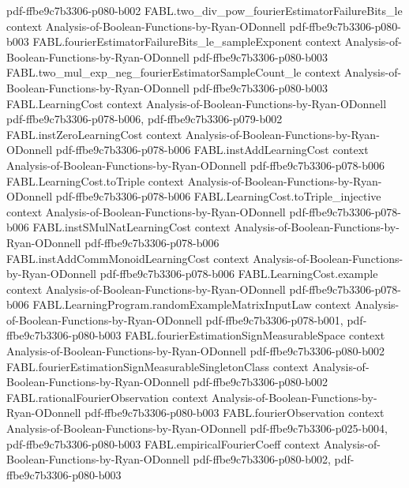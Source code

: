 \begin{theorem}
  {pdf-ffbe9c7b3306-p080-b002}
\proofstep
  {FABL.two_div_pow_fourierEstimatorFailureBits_le}
  {context}
  {Analysis-of-Boolean-Functions-by-Ryan-ODonnell}
  {pdf-ffbe9c7b3306-p080-b003}
\proofstep
  {FABL.fourierEstimatorFailureBits_le_sampleExponent}
  {context}
  {Analysis-of-Boolean-Functions-by-Ryan-ODonnell}
  {pdf-ffbe9c7b3306-p080-b003}
\proofstep
  {FABL.two_mul_exp_neg_fourierEstimatorSampleCount_le}
  {context}
  {Analysis-of-Boolean-Functions-by-Ryan-ODonnell}
  {pdf-ffbe9c7b3306-p080-b003}
\proofstep
  {FABL.LearningCost}
  {context}
  {Analysis-of-Boolean-Functions-by-Ryan-ODonnell}
  {pdf-ffbe9c7b3306-p078-b006,
    pdf-ffbe9c7b3306-p079-b002}
\proofstep
  {FABL.instZeroLearningCost}
  {context}
  {Analysis-of-Boolean-Functions-by-Ryan-ODonnell}
  {pdf-ffbe9c7b3306-p078-b006}
\proofstep
  {FABL.instAddLearningCost}
  {context}
  {Analysis-of-Boolean-Functions-by-Ryan-ODonnell}
  {pdf-ffbe9c7b3306-p078-b006}
\proofstep
  {FABL.LearningCost.toTriple}
  {context}
  {Analysis-of-Boolean-Functions-by-Ryan-ODonnell}
  {pdf-ffbe9c7b3306-p078-b006}
\proofstep
  {FABL.LearningCost.toTriple_injective}
  {context}
  {Analysis-of-Boolean-Functions-by-Ryan-ODonnell}
  {pdf-ffbe9c7b3306-p078-b006}
\proofstep
  {FABL.instSMulNatLearningCost}
  {context}
  {Analysis-of-Boolean-Functions-by-Ryan-ODonnell}
  {pdf-ffbe9c7b3306-p078-b006}
\proofstep
  {FABL.instAddCommMonoidLearningCost}
  {context}
  {Analysis-of-Boolean-Functions-by-Ryan-ODonnell}
  {pdf-ffbe9c7b3306-p078-b006}
\proofstep
  {FABL.LearningCost.example}
  {context}
  {Analysis-of-Boolean-Functions-by-Ryan-ODonnell}
  {pdf-ffbe9c7b3306-p078-b006}
\proofstep
  {FABL.LearningProgram.randomExampleMatrixInputLaw}
  {context}
  {Analysis-of-Boolean-Functions-by-Ryan-ODonnell}
  {pdf-ffbe9c7b3306-p078-b001,
    pdf-ffbe9c7b3306-p080-b003}
\proofstep
  {FABL.fourierEstimationSignMeasurableSpace}
  {context}
  {Analysis-of-Boolean-Functions-by-Ryan-ODonnell}
  {pdf-ffbe9c7b3306-p080-b002}
\proofstep
  {FABL.fourierEstimationSignMeasurableSingletonClass}
  {context}
  {Analysis-of-Boolean-Functions-by-Ryan-ODonnell}
  {pdf-ffbe9c7b3306-p080-b002}
\proofstep
  {FABL.rationalFourierObservation}
  {context}
  {Analysis-of-Boolean-Functions-by-Ryan-ODonnell}
  {pdf-ffbe9c7b3306-p080-b003}
\proofstep
  {FABL.fourierObservation}
  {context}
  {Analysis-of-Boolean-Functions-by-Ryan-ODonnell}
  {pdf-ffbe9c7b3306-p025-b004,
    pdf-ffbe9c7b3306-p080-b003}
\proofstep
  {FABL.empiricalFourierCoeff}
  {context}
  {Analysis-of-Boolean-Functions-by-Ryan-ODonnell}
  {pdf-ffbe9c7b3306-p080-b002,
    pdf-ffbe9c7b3306-p080-b003}

\end{theorem}
